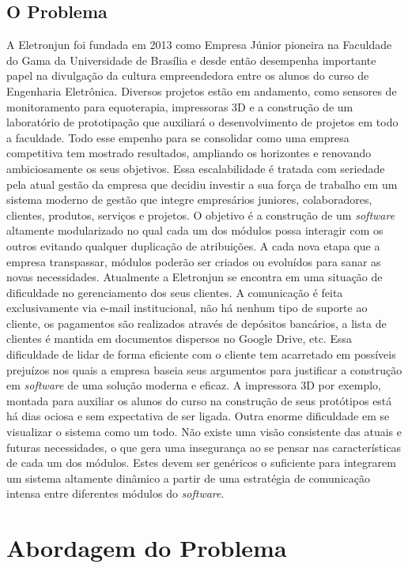     \subsection{O Problema}
      A Eletronjun foi fundada em 2013 como Empresa Júnior pioneira na Faculdade do Gama da Universidade de Brasília e desde então desempenha importante papel na divulgação da cultura empreendedora entre os alunos do curso de Engenharia Eletrônica. Diversos projetos estão em andamento, como sensores de monitoramento para equoterapia, impressoras 3D e a construção de um laboratório de prototipação que auxiliará o desenvolvimento de projetos em todo a faculdade.
      Todo esse empenho para se consolidar como uma empresa competitiva tem mostrado resultados, ampliando os horizontes e renovando ambiciosamente os seus objetivos.
      Essa escalabilidade é tratada com seriedade pela atual gestão da empresa que decidiu investir a sua força de trabalho em um sistema moderno de gestão que integre empresários juniores, colaboradores, clientes, produtos, serviços e projetos. O objetivo é a construção de um \textit{software} altamente modularizado no qual cada um dos módulos possa interagir com os outros evitando qualquer duplicação de atribuições. A cada nova etapa que a empresa transpassar, módulos poderão ser criados ou evoluídos para sanar as novas necessidades.
      Atualmente a Eletronjun se encontra em uma situação de dificuldade no gerenciamento dos seus clientes. A comunicação é feita exclusivamente via e-mail institucional, não há nenhum tipo de suporte ao cliente, os pagamentos são realizados através de depósitos bancários, a lista de clientes é mantida em documentos dispersos no Google Drive, etc. Essa dificuldade de lidar de forma eficiente com o cliente tem acarretado em possíveis prejuízos nos quais a empresa baseia seus argumentos para justificar a construção em \textit{software} de uma solução moderna e eficaz. A impressora 3D por exemplo, montada para auxiliar os alunos do curso na construção de seus protótipos está há dias ociosa e sem expectativa de ser ligada.
      Outra enorme dificuldade em se visualizar o sistema como um todo. Não existe uma visão consistente das atuais e futuras necessidades, o que gera uma insegurança ao se pensar nas características de cada um dos módulos. Estes devem ser genéricos o suficiente para integrarem um sistema altamente dinâmico a partir de uma estratégia de comunicação intensa entre diferentes módulos do \textit{software}.

  \section{Abordagem do Problema}
